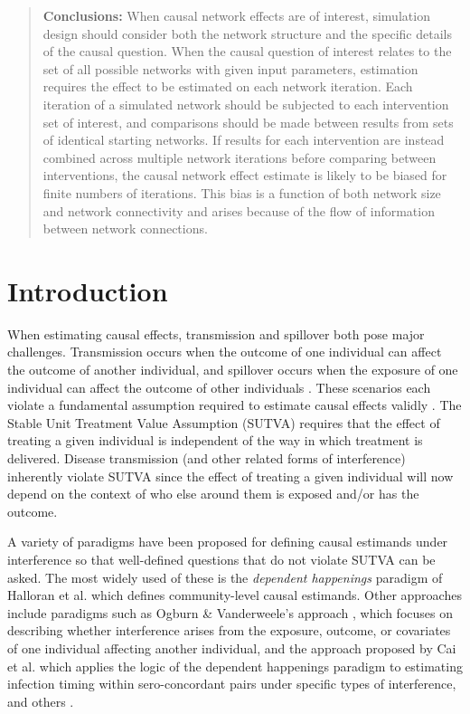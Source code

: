 \documentclass{article}
\theoremstyle{definition}
\begin{document}
\begin{abstract}
\textbf{Conclusions:} When causal network effects are of interest, simulation design should consider both the network structure and the specific details of the causal question. When the causal question of interest relates to the set of all possible networks with given input parameters, estimation requires the effect to be estimated on each network iteration. Each iteration of a simulated network should be subjected to each intervention set of interest, and comparisons should be made between results from sets of identical starting networks. If results for each intervention are instead combined across multiple network iterations before comparing between interventions, the causal network effect estimate is likely to be biased for finite numbers of iterations. This bias is a function of both network size and network connectivity and arises because of the flow of information between network connections.
\end{abstract}

\newpage


\section{Introduction}
When estimating causal effects, transmission and spillover both pose major challenges. Transmission occurs when the outcome of one individual can affect the outcome of another individual, and spillover occurs when the exposure of one individual can affect the outcome of other individuals \cite{halloran_dependent_2016}. These scenarios each violate a fundamental assumption required to estimate causal effects validly \cite{halloran_study_1991}. The Stable Unit Treatment Value Assumption (SUTVA) requires that the effect of treating a given individual is independent of the way in which treatment is delivered. Disease transmission (and other related forms of interference) inherently violate SUTVA since the effect of treating a given individual will now depend on the context of who else around them is exposed and/or has the outcome. 

A variety of paradigms have been proposed for defining causal estimands under interference so that well-defined questions that do not violate SUTVA can be asked. The most widely used of these is the \emph{dependent happenings} paradigm of Halloran et al.  \cite{halloran_study_1991} which defines community-level causal estimands. Other approaches include paradigms such as Ogburn \& Vanderweele's approach \cite{ogburn_causal_2014}, which focuses on describing whether interference arises from the exposure, outcome, or covariates of one individual affecting another individual, and the approach proposed by Cai et al. \cite{cai_causal_2021} which applies the logic of the dependent happenings paradigm to estimating infection timing within sero-concordant pairs under specific types of interference, and others \cite{forastiere_identification_2021,savje_average_2021}. 
\end{document}
